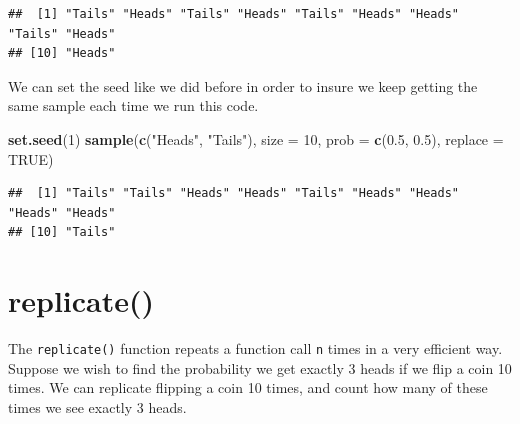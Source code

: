 \documentclass[
]{book}
\newenvironment{Shaded}{\begin{snugshade}}{\end{snugshade}}
\newcommand{\DataTypeTok}[1]{\textcolor[rgb]{0.13,0.29,0.53}{#1}}
\newcommand{\DecValTok}[1]{\textcolor[rgb]{0.00,0.00,0.81}{#1}}
\newcommand{\FloatTok}[1]{\textcolor[rgb]{0.00,0.00,0.81}{#1}}
\newcommand{\KeywordTok}[1]{\textcolor[rgb]{0.13,0.29,0.53}{\textbf{#1}}}
\newcommand{\NormalTok}[1]{#1}
\newcommand{\OtherTok}[1]{\textcolor[rgb]{0.56,0.35,0.01}{#1}}
\newcommand{\StringTok}[1]{\textcolor[rgb]{0.31,0.60,0.02}{#1}}
\begin{document}
\begin{verbatim}
##  [1] "Tails" "Heads" "Tails" "Heads" "Tails" "Heads" "Heads" "Tails" "Heads"
## [10] "Heads"
\end{verbatim}

We can set the seed like we did before in order to insure we keep getting the same sample each time we run this code.

\begin{Shaded}
\begin{Highlighting}[]
\KeywordTok{set.seed}\NormalTok{(}\DecValTok{1}\NormalTok{)}
\KeywordTok{sample}\NormalTok{(}\KeywordTok{c}\NormalTok{(}\StringTok{"Heads"}\NormalTok{, }\StringTok{"Tails"}\NormalTok{),}
    \DataTypeTok{size =} \DecValTok{10}\NormalTok{, }\DataTypeTok{prob =} \KeywordTok{c}\NormalTok{(}\FloatTok{0.5}\NormalTok{,}
        \FloatTok{0.5}\NormalTok{), }\DataTypeTok{replace =} \OtherTok{TRUE}\NormalTok{)}
\end{Highlighting}
\end{Shaded}

\begin{verbatim}
##  [1] "Tails" "Tails" "Heads" "Heads" "Tails" "Heads" "Heads" "Heads" "Heads"
## [10] "Tails"
\end{verbatim}

\hypertarget{replicate}{%
\section{replicate()}\label{replicate}}

The \texttt{replicate()} function repeats a function call \texttt{n} times in a very efficient way. Suppose we wish to find the probability we get exactly 3 heads if we flip a coin 10 times. We can replicate flipping a coin 10 times, and count how many of these times we see exactly 3 heads.
\end{document}
